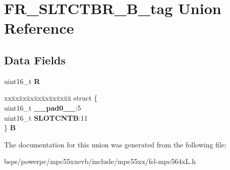 \hypertarget{unionFR__SLTCTBR__16B__tag}{}\section{F\+R\+\_\+\+S\+L\+T\+C\+T\+B\+R\+\_\+B\+\_\+tag Union Reference}
\label{unionFR__SLTCTBR__16B__tag}
\subsection*{Data Fields}
\begin{DoxyCompactItemize}
\item 
\mbox{\label{unionFR__SLTCTBR__16B__tag_a24c8fd0cac85b137fcf3f7cc92840993}} 
uint16\+\_\+t {\bfseries R}
\item 
\mbox{\label{unionFR__SLTCTBR__16B__tag_a8382f4c1b45badd3c35493e6be0682ec}} 
\begin{tabbing}
xx\=xx\=xx\=xx\=xx\=xx\=xx\=xx\=xx\=\kill
struct \{\\
\>uint16\_t {\bfseries \_\_pad0\_\_}:5\\
\>uint16\_t {\bfseries SLOTCNTB}:11\\
\} {\bfseries B}\\

\end{tabbing}\end{DoxyCompactItemize}


The documentation for this union was generated from the following file\+:\begin{DoxyCompactItemize}
\item 
bsps/powerpc/mpc55xxevb/include/mpc55xx/fsl-\/mpc564x\+L.\+h\end{DoxyCompactItemize}
